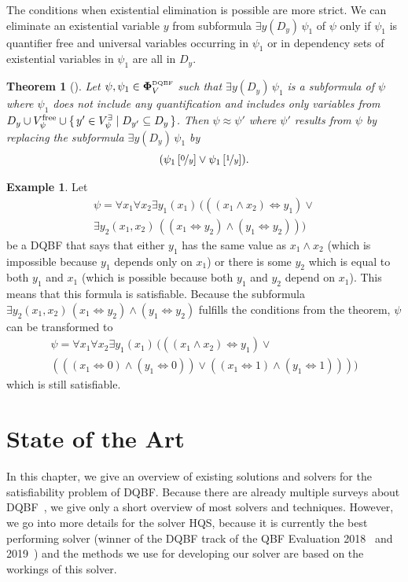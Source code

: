 \documentclass[
  digital, %
  color,
  twoside, %
  table,   %
  nolof,     %
  nolot,     %
]{fithesis3}
\let\setbuilder\set
\newcommand{\simpleset}[1]{\{{#1}\}}
\renewcommand{\set}[1]{\normalexpandarg\IfSubStr{#1}{|}{\setbuilder{#1}}{\simpleset{#1}}}
\newtheorem{theorem}{Theorem}[chapter] %
\theoremstyle{definition}
\newtheorem{example}{Example}
\theoremstyle{remark}
\newcommand{\substitute}[2]{\left[ \nicefrac{#2}{#1} \right]}
\newcommand{\DQBF}[1]{\mathbf{\Phi}_{#1}^{\normalfont{\text{\tiny DQBF}}}}
\newcommand{\evars}[1]{V_{#1}^{\exists}}
\newcommand{\fvars}[1]{V_{#1}^{\mathrm{free}}}
\newcommand{\lequal}{\Leftrightarrow}
\newcommand{\itholds}{\,}
\begin{document}
The conditions when existential elimination is possible are more strict. We can eliminate an existential variable $y$ from subformula $\exists y (D_y) \itholds \psi_1$ of $\psi$ only if $\psi_1$ is quantifier free and universal variables occurring in $\psi_1$ or in dependency sets of existential variables in $\psi_1$ are all in $D_y$.

\begin{theorem}[{\cite[Theorem 5]{HQSquantifierLocalisation}}]
\label{thrm:exElim}
  Let $\psi, \psi_1 \in \DQBF{V}$ such that $\exists y(D_y)\itholds\psi_1$ is a subformula of $\psi$ where $\psi_1$ does not include any quantification and includes only variables from $D_y \cup \fvars{\psi} \cup \set{y' \in \evars{\psi} | D_{y'} \subseteq D_y}$. Then $\psi \approx \psi'$ where $\psi'$ results from $\psi$ by replacing the subformula $\exists y(D_y)\itholds\psi_1$ by
  \[(\psi_1\substitute{y}{0} \lor \psi_1\substitute{y}{1}).\]
\end{theorem}
\begin{example}
Let
\begin{multline*}
\psi = \forall x_1 \forall x_2 \exists y_1(x_1) \itholds (((x_1 \land x_2) \lequal y_1) \lor {} \\
\exists y_2 (x_1,x_2) \itholds ((x_1 \lequal y_2) \land (y_1 \lequal y_2)))
\end{multline*}
be a DQBF that says that either $y_1$ has the same value as $x_1 \land x_2$ (which is impossible because $y_1$ depends only on $x_1$) or there is some $y_2$ which is equal to both $y_1$ and $x_1$ (which is possible because both $y_1$ and $y_2$ depend on $x_1$). This means that this formula is satisfiable. Because the subformula $\exists y_2 (x_1,x_2) \itholds (x_1 \lequal y_2) \land (y_1 \lequal y_2)$ fulfills the conditions from the theorem, $\psi$ can be transformed to
\begin{multline*}
\psi = \forall x_1 \forall x_2 \exists y_1(x_1) \itholds (((x_1 \land x_2) \lequal y_1) \lor {}\\
(((x_1 \lequal 0) \land (y_1 \lequal 0)) \lor ((x_1 \lequal 1) \land (y_1 \lequal 1))))
\end{multline*}
which is still satisfiable.
\end{example}



\chapter{State of the Art}
\label{chap:SoA}
In this chapter, we give an overview of existing solutions and solvers for the satisfiability problem of DQBF. Because there are already multiple surveys about DQBF~\cite{DQBFStateOfArtTalk,DQBFStateOfArt,DQBFStateOfArtNew}, we give only a short overview of most solvers and techniques. However, we go into more details for the solver HQS, because it is currently the best performing solver (winner of the DQBF track of the QBF Evaluation 2018~\cite{QBFeval18} and 2019~\cite{QBFeval19}) and the methods we use for developing our solver are based on the workings of this solver.
\end{document}

